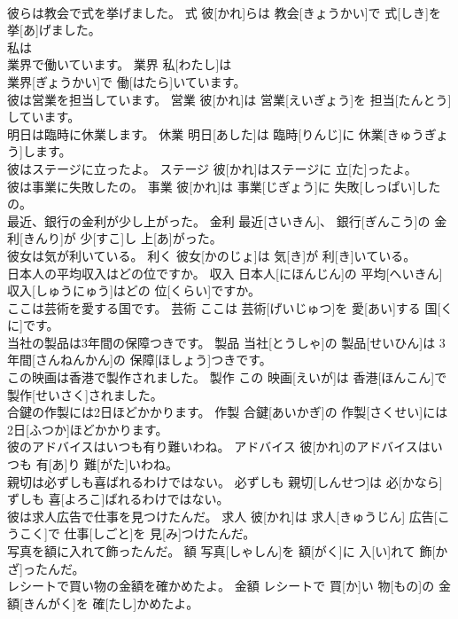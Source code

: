 \documentclass[8pt]{extreport}
\begin{document}
\begin{CJK}{UTF8}{min}
\\	彼らは教会で式を挙げました。	式	彼[かれ]らは 教会[きょうかい]で 式[しき]を 挙[あ]げました。	
\\	私は
\\	業界で働いています。	業界	私[わたし]は
\\	業界[ぎょうかい]で 働[はたら]いています。	
\\	彼は営業を担当しています。	営業	彼[かれ]は 営業[えいぎょう]を 担当[たんとう]しています。	
\\	明日は臨時に休業します。	休業	明日[あした]は 臨時[りんじ]に 休業[きゅうぎょう]します。	
\\	彼はステージに立ったよ。	ステージ	彼[かれ]はステージに 立[た]ったよ。	
\\	彼は事業に失敗したの。	事業	彼[かれ]は 事業[じぎょう]に 失敗[しっぱい]したの。	
\\	最近、銀行の金利が少し上がった。	金利	最近[さいきん]、 銀行[ぎんこう]の 金利[きんり]が 少[すこ]し 上[あ]がった。	
\\	彼女は気が利いている。	利く	彼女[かのじょ]は 気[き]が 利[き]いている。	
\\	日本人の平均収入はどの位ですか。	収入	日本人[にほんじん]の 平均[へいきん] 収入[しゅうにゅう]はどの 位[くらい]ですか。	
\\	ここは芸術を愛する国です。	芸術	ここは 芸術[げいじゅつ]を 愛[あい]する 国[くに]です。	
\\	当社の製品は3年間の保障つきです。	製品	当社[とうしゃ]の 製品[せいひん]は 3年間[さんねんかん]の 保障[ほしょう]つきです。	
\\	この映画は香港で製作されました。	製作	この 映画[えいが]は 香港[ほんこん]で 製作[せいさく]されました。	
\\	合鍵の作製には2日ほどかかります。	作製	合鍵[あいかぎ]の 作製[さくせい]には 2日[ふつか]ほどかかります。	
\\	彼のアドバイスはいつも有り難いわね。	アドバイス	彼[かれ]のアドバイスはいつも 有[あ]り 難[がた]いわね。	
\\	親切は必ずしも喜ばれるわけではない。	必ずしも	親切[しんせつ]は 必[かなら]ずしも 喜[よろこ]ばれるわけではない。	
\\	彼は求人広告で仕事を見つけたんだ。	求人	彼[かれ]は 求人[きゅうじん] 広告[こうこく]で 仕事[しごと]を 見[み]つけたんだ。	
\\	写真を額に入れて飾ったんだ。	額	写真[しゃしん]を 額[がく]に 入[い]れて 飾[かざ]ったんだ。	
\\	レシートで買い物の金額を確かめたよ。	金額	レシートで 買[か]い 物[もの]の 金額[きんがく]を 確[たし]かめたよ。	

\end{CJK}
\end{document}
